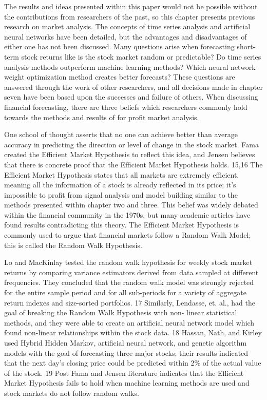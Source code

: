 \documentclass[../main.tex]{subfiles}
\begin{document}
    The results and ideas presented within this paper would not be possible without the contributions from researchers of the past, so this chapter presents previous research on market analysis.
    The concepts of time series analysis and artificial neural networks have been detailed, but the advantages and disadvantages of either one has not been discussed.
    Many questions arise when forecasting short-term stock returns like is the stock market random or predictable?
    Do time series analysis methods outperform machine learning methods?
    Which neural network weight optimization method creates better forecasts?
    These questions are answered through the work of other researchers, and all decisions made in chapter seven have been based upon the successes and failure of others.
    When discussing financial forecasting, there are three beliefs which researchers commonly hold towards the methods and results of for profit market analysis.

    One school of thought asserts that no one can achieve better than average accuracy in predicting the direction or level of change in the stock market.
    Fama created the Efficient Market Hypothesis to reflect this idea, and Jensen believes that there is concrete proof that the Efficient Market Hypothesis holds. 15,16
    The Efficient Market Hypothesis states that all markets are extremely efficient, meaning all the information of a stock is already reflected in its price; it’s impossible to profit from signal analysis and model building similar to the methods presented within chapter two and three.
    This belief was widely debated within the financial community in the 1970s, but many academic articles have found results contradicting this theory.
    The Efficient Market Hypothesis is commonly used to argue that financial markets follow a Random Walk Model; this is called the Random Walk Hypothesis.

    Lo and MacKinlay tested the random walk hypothesis for weekly stock market returns by comparing variance estimators derived from data sampled at different frequencies.
    They concluded that the random walk model was strongly rejected for the entire sample period and for all sub-periods for a variety of aggregate return indexes and size-sorted portfolios. 17
    Similarly, Lendasse, et. al., had the goal of breaking the Random Walk Hypothesis with non- linear statistical methods, and they were able to create an artificial neural network model which found non-linear relationships within the stock data. 18
    Hassan, Nath, and Kirley used Hybrid Hidden Markov, artificial neural network, and genetic algorithm models with the goal of forecasting three major stocks; their results indicated that the next day’s closing price could be predicted within 2\% of the actual value of the stock. 19
    Post Fama and Jensen literature indicates that the Efficient Market Hypothesis fails to hold when machine learning methods are used and stock markets do not follow random walks.
\end{document}
